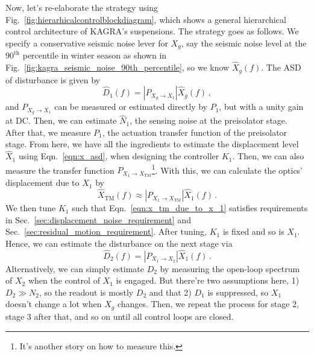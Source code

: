 Now, let's re-elaborate the strategy using Fig.~\ref{fig:hierarhicalcontrolblockdiagram}, which shows a general hierarchical control architecture of KAGRA's suspensions.
The strategy goes as follows.
We specify a conservative seismic noise lever for $X_g$, say the seismic noise level at the $90^\mathrm{th}$ percentile in winter season as shown in Fig.~\ref{fig:kagra_seismic_noise_90th_percentile}, so we know $\hat{X}_g(f)$.
The ASD of disturbance is given by
\begin{equation}
	\hat{D}_1(f) = \left\lvert P_{X_g\to X_1} \right\rvert \hat{X}_g(f)\,,
\end{equation}
and $P_{X_g\to X_1}$ can be measured or estimated directly by $P_1$, but with a unity gain at DC.
Then, we can estimate $\hat{N}_1$, the sensing noise at the preisolator stage.
After that, we measure $P_1$, the actuation transfer function of the preisolator stage.
From here, we have all the ingredients to estimate the displacement level $\hat{X}_1$ using Eqn.~\eqref{eqn:x_asd}, when designing the controller $K_1$.
Then, we can also measure the transfer function $P_{X_1\to X_\mathrm{TM}}$\footnote{It's another story on how to measure this.}.
With this, we can calculate the optics' displacement due to $X_1$ by
\begin{equation}
	\hat{X}_\mathrm{TM}(f) \approx \left\lvert P_{X_1\to X_\mathrm{TM}} \right\rvert \hat{X}_1(f)\,.
	\label{eqn:x_tm_due_to_x_1}
\end{equation}
We then tune $K_1$ such that Eqn.~\eqref{eqn:x_tm_due_to_x_1} satisfies requirements in Sec.~\ref{sec:displacement_noise_requirement} and Sec.~\ref{sec:residual_motion_requirement}.
After tuning, $K_1$ is fixed and so is $X_1$.
Hence, we can estimate the disturbance on the next stage via
\begin{equation}
	\hat{D}_2(f) = \left\lvert P_{X_1\to X_2}\right\rvert \hat{X}_1(f)\,.
\end{equation}
Alternatively, we can simply estimate $D_2$ by measuring the open-loop spectrum of $X_2$ when the control of $X_1$ is engaged.
But there're two assumptions here, 1) $D_2\gg N_2$, so the readout is mostly $D_2$ and that 2) $D_1$ is suppressed, so $X_1$ doesn't change a lot when $X_g$ changes.
Then, we repeat the process for stage 2, stage 3 after that, and so on until all control loops are closed.

